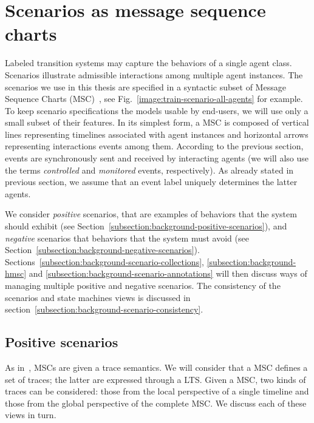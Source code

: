 \section{Scenarios as message sequence charts\label{section:background-scenarios}}

Labeled transition systems may capture the behaviors of a single agent class. Scenarios illustrate admissible interactions among multiple agent instances. The scenarios we use in this thesis are specified in a syntactic subset of Message Sequence Charts (MSC)~\cite{ITU:1996}, see Fig.~\ref{image:train-scenario-all-agents} for example. To keep scenario specifications the models usable by end-users, we will use only a small subset of their features. In its simplest form, a MSC is composed of vertical lines representing timelines associated with agent instances and horizontal arrows representing interactions events among them. According to the previous section, events are synchronously sent and received by interacting agents (we will also use the terms \emph{controlled} and \emph{monitored} events, respectively). As already stated in previous section, we assume that an event label uniquely determines the latter agents. 

We consider \emph{positive} scenarios, that are examples of behaviors that the system should exhibit (see Section~\ref{subsection:background-positive-scenarios}), and \emph{negative} scenarios that behaviors that the system must avoid (see Section~\ref{subsection:background-negative-scenarios}). Sections~\ref{subsection:background-scenario-collections}, \ref{subsection:background-hmsc} and \ref{subsection:background-scenario-annotations} will then discuss ways of managing multiple positive and negative scenarios. The consistency of the scenarios and state machines views is discussed in section~\ref{subsection:background-scenario-consistency}.

\subsection{Positive scenarios\label{subsection:background-positive-scenarios}}

As in~\cite{Uchitel:2004}, MSCs are given a trace semantics. We will consider that a MSC defines a set of traces; the latter are expressed through a LTS. Given a MSC, two kinds of traces can be considered: those from the local perspective of a single timeline and those from the global perspective of the complete MSC. We discuss each of these views in turn.

